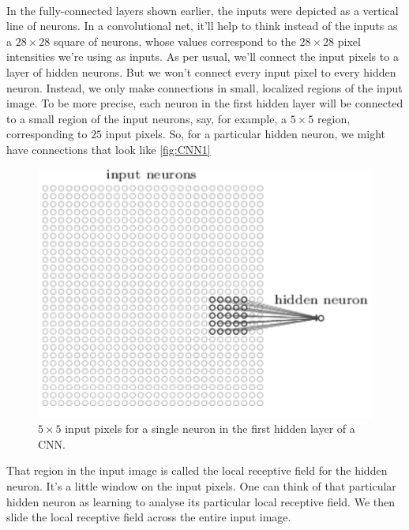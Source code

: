 \paragraph{} In the fully-connected layers shown earlier, the inputs were depicted as a vertical line of neurons. In a convolutional net, it'll help to think instead of the inputs as a $28\times 28$ square of neurons, whose values correspond to the $28\times 28$ pixel intensities we're using as inputs. As per usual, we'll connect the input pixels to a layer of hidden neurons. But we won't connect every input pixel to every hidden neuron. Instead, we only make connections in small, localized regions of the input image. To be more precise, each neuron in the first hidden layer will be connected to a small region of the input neurons, say, for example, a $5\times5$ region, corresponding to $25$ input pixels. So, for a particular hidden neuron, we might have connections that look like \autoref{fig:CNN1}
\begin{figure}
\centering
\includegraphics[scale=0.5]{img/CNN1}
\caption{$5\times 5$ input pixels for a single neuron in the first hidden layer of a CNN.}
\label{fig:CNN1}
\end{figure}
That region in the input image is called the local receptive field for the hidden neuron. It's a little window on the input pixels. One can think of that particular hidden neuron as learning to analyse its particular local receptive field. We then slide the local receptive field across the entire input image.

